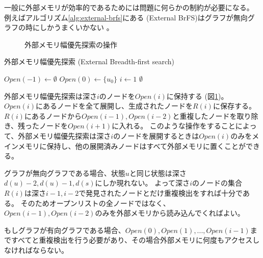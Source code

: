 一般に外部メモリが効率的であるためには問題に何らかの制約が必要になる。
例えばアルゴリズム\ref{alg:external-brfs}にある (External BrFS)はグラフが無向グラフの時にしかうまくいかない \cite{mehlhorn2002external}。

\begin{figure}
  \centering
  \scalebox{0.75}{
  \begin{tikzpicture}[scale=0.6]
    
  \end{tikzpicture}
  }
  \caption{外部メモリ幅優先探索の操作}
  \label{fig:external-brfs}
\end{figure}

\begin{algorithm}
\caption{外部メモリ幅優先探索 (External Breadth-first search)}
\label{alg:external-brfs}
	$Open(-1) \leftarrow \emptyset$\;
	$Open(0) \leftarrow \{u_0\}$\;
	$i \leftarrow 1$\;
	\Return $\emptyset$\;
\end{algorithm}

外部メモリ幅優先探索は深さ$i$のノードを$Open(i)$に保持する (図\ref{fig:external-brfs})。
$Open(i)$にあるノードを全て展開し、生成されたノードを$R(i)$に保存する。
$R(i)$にあるノードから$Open(i-1), Open(i-2)$と重複したノードを取り除き、残ったノードを$Open(i+1)$に入れる。
このような操作をすることによって、外部メモリ幅優先探索は深さ$i$のノードを展開するときは$Open(i)$のみをメインメモリに保持し、他の展開済みノードはすべて外部メモリに置くことができる。

グラフが無向グラフである場合、状態$u$と同じ状態は深さ$d(u)-2, d(u)-1, d(s)$にしか現れない。
よって深さ$i$のノードの集合$R(i)$は深さ$i-1, i-2$で発見されたノードとだけ重複検出をすれば十分である。
そのためオープンリストの全ノードではなく、$Open(i-1), Open(i-2)$のみを外部メモリから読み込んでくればよい。

もしグラフが有向グラフである場合、$Open(0), Open(1), ..., Open(i-1)$まですべてと重複検出を行う必要があり、その場合外部メモリに何度もアクセスしなければならない。


